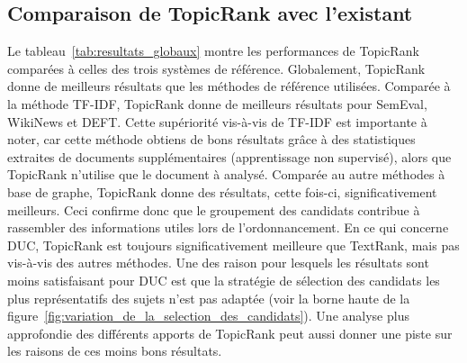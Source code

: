   \subsection{Comparaison de TopicRank avec l'existant}
  \label{subsec:comparaison_de_topicrank_avec_l_existant}
    Le tableau~\ref{tab:resultats_globaux} montre les performances de TopicRank
    comparées à celles des trois systèmes de référence.
    Globalement, TopicRank donne de meilleurs résultats que les méthodes de
    référence utilisées.
    Comparée à la méthode TF-IDF, TopicRank donne de meilleurs résultats pour
    SemEval, WikiNews et DEFT. Cette supériorité vis-à-vis de TF-IDF est
    importante à noter, car cette méthode obtiens de bons résultats grâce à des
    statistiques extraites de documents supplémentaires (apprentissage non
    supervisé), alors que TopicRank n'utilise que le document à analysé.
    Comparée au autre méthodes à base de graphe, TopicRank donne des résultats,
    cette fois-ci, significativement meilleurs. Ceci confirme donc que le
    groupement des candidats contribue à rassembler des informations utiles lors
    de l'ordonnancement. En ce qui concerne DUC, TopicRank est toujours
    significativement meilleure que TextRank, mais pas vis-à-vis des autres
    méthodes. Une des raison pour lesquels les résultats sont moins satisfaisant
    pour DUC est que la stratégie de sélection des candidats les plus
    représentatifs des sujets n'est pas adaptée (voir la borne haute de la
    figure~\ref{fig:variation_de_la_selection_des_candidats}). Une analyse plus
    approfondie des différents apports de TopicRank peut aussi donner une piste
    sur les raisons de ces moins bons résultats.
